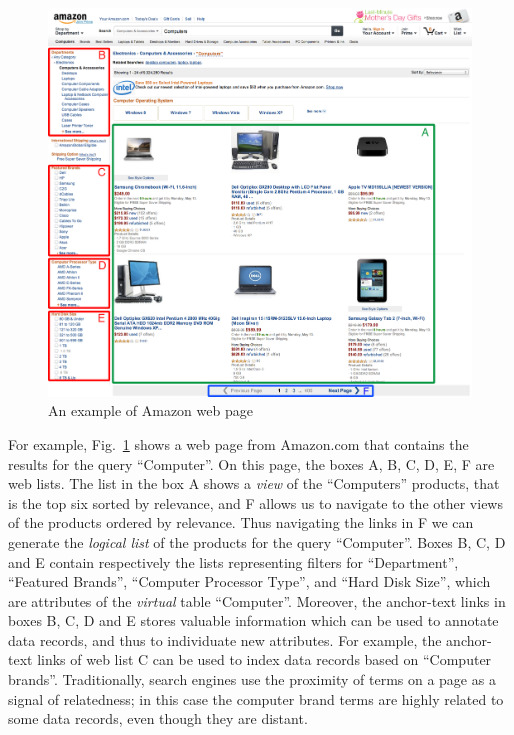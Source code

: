 \begin{figure}[t!]
\centering
\includegraphics[scale=0.40]{imgs/chap_2/Amazon.png}
\caption{An example of Amazon web page}
\label{fig:amazon}
\end{figure}
For example, Fig.~\ref{fig:amazon} shows a web page from Amazon.com that contains the results for the query ``Computer''.
On this page, the boxes A, B, C, D, E, F are web lists. The list in the box A shows a \emph{view} of the ``Computers'' products, that is the top six sorted by relevance, and F allows us to navigate to the other views of the products ordered by relevance. Thus navigating the links in F we can generate the \emph{logical list} of the products for the query ``Computer''. Boxes B, C, D and E contain respectively the lists representing filters for ``Department'', ``Featured Brands'', ``Computer Processor Type'', and ``Hard Disk Size'', which are attributes of the \emph{virtual} table ``Computer''. Moreover, the anchor-text links in boxes B, C, D and E stores valuable information which can be used to annotate data records, and thus to individuate new attributes. For example, the anchor-text links of web list C can be used to index data records based on ``Computer brands''. Traditionally, search engines use the proximity of terms on a page as a signal of relatedness; in this case the computer brand terms are highly related to some data records, even though they are distant.


